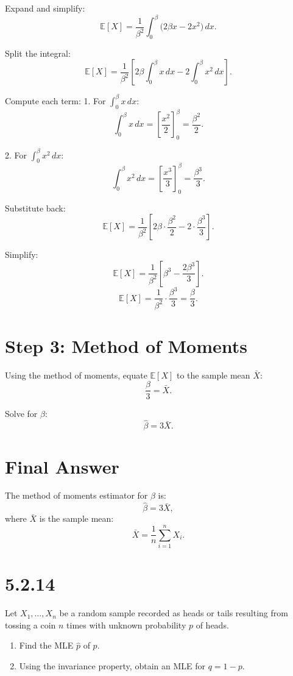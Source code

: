 \documentclass{article}
\begin{document}
Expand and simplify:
\[
\mathbb{E}[X] = \frac{1}{\beta^2} \int_0^\beta \big(2\beta x - 2x^2\big) \, dx.
\]

Split the integral:
\[
\mathbb{E}[X] = \frac{1}{\beta^2} \left[ 2\beta \int_0^\beta x \, dx - 2 \int_0^\beta x^2 \, dx \right].
\]

Compute each term:
1. For $\int_0^\beta x \, dx$:
\[
\int_0^\beta x \, dx = \left[ \frac{x^2}{2} \right]_0^\beta = \frac{\beta^2}{2}.
\]

2. For $\int_0^\beta x^2 \, dx$:
\[
\int_0^\beta x^2 \, dx = \left[ \frac{x^3}{3} \right]_0^\beta = \frac{\beta^3}{3}.
\]

Substitute back:
\[
\mathbb{E}[X] = \frac{1}{\beta^2} \left[ 2\beta \cdot \frac{\beta^2}{2} - 2 \cdot \frac{\beta^3}{3} \right].
\]

Simplify:
\[
\mathbb{E}[X] = \frac{1}{\beta^2} \left[ \beta^3 - \frac{2\beta^3}{3} \right].
\]
\[
\mathbb{E}[X] = \frac{1}{\beta^2} \cdot \frac{\beta^3}{3} = \frac{\beta}{3}.
\]

\section*{Step 3: Method of Moments}
Using the method of moments, equate $\mathbb{E}[X]$ to the sample mean $\bar{X}$:
\[
\frac{\beta}{3} = \bar{X}.
\]

Solve for $\beta$:
\[
\hat{\beta} = 3\bar{X}.
\]

\section*{Final Answer}
The method of moments estimator for $\beta$ is:
\[
\hat{\beta} = 3\bar{X},
\]
where $\bar{X}$ is the sample mean:
\[
\bar{X} = \frac{1}{n} \sum_{i=1}^n X_i.
\]

\section*{5.2.14}

Let $X_1, \dots, X_n$ be a random sample recorded as heads or tails resulting from tossing a coin $n$ times with unknown probability $p$ of heads. 

\begin{enumerate}
    \item Find the MLE $\hat{p}$ of $p$.
    \item Using the invariance property, obtain an MLE for $q = 1 - p$.
\end{enumerate}
\end{document}
